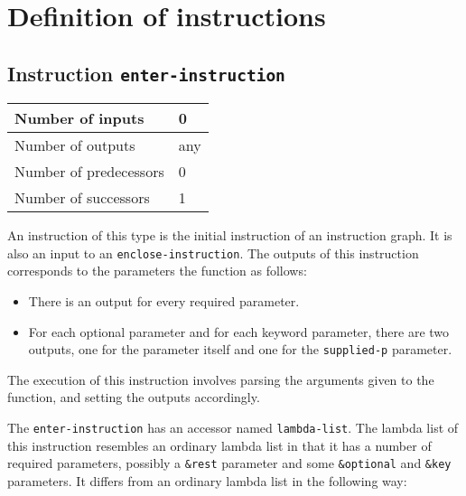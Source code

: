 \section{Definition of instructions}
\label{sec-ir-instructions}

\subsection{Instruction \texttt{enter-instruction}}
\label{mir-instruction-enter}

\begin{tabular}{|l|l|}
\hline
Number of inputs & 0\\
\hline
Number of outputs & any\\
\hline
Number of predecessors & 0\\
\hline
Number of successors & 1\\
\hline
\end{tabular}

An instruction of this type is the initial instruction of an
instruction graph.  It is also an input to an
\texttt{enclose-instruction}.  The outputs of this instruction
corresponds to the parameters the function as follows:

\begin{itemize}
\item There is an output for every required parameter.
\item For each optional parameter and for each keyword parameter,
  there are two outputs, one for the parameter itself and one for the
  \texttt{supplied-p} parameter.
\end{itemize}

The execution of this instruction involves parsing the arguments given
to the function, and setting the outputs accordingly.  

The \texttt{enter-instruction} has an accessor named
\texttt{lambda-list}.  The lambda list of this instruction resembles
an ordinary lambda list in that it has a number of required
parameters, possibly a \texttt{\&rest} parameter and some
\texttt{\&optional} and \texttt{\&key} parameters.  It differs from an
ordinary lambda list in the following way:

